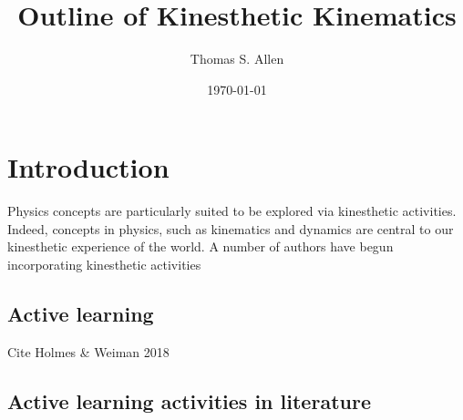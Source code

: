 \documentclass[prb,preprint]{revtex4-1}
\begin{document}

\title{Outline of Kinesthetic Kinematics }

\author{Thomas S. Allen}



\date{\today}

\begin{abstract}

\end{abstract}

\maketitle %


\section{Introduction} %

Physics concepts are particularly suited to be explored via kinesthetic activities.  Indeed, concepts in physics, such as kinematics and dynamics are central to our kinesthetic experience of the world.  A number of authors have begun incorporating kinesthetic activities 

\subsection{Active learning} 
Cite Holmes \& Weiman 2018

\subsection{Active learning activities in literature} 
\end{document}
